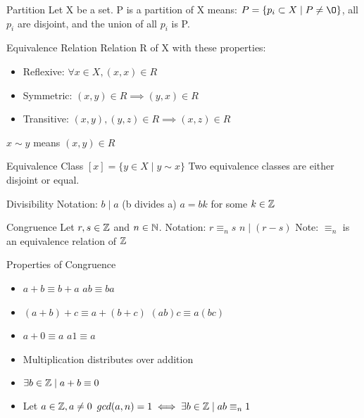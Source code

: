 \begin{flashcard}[Definition]{Partition}
  Let X be a set. P is a partition of X means:
  \vfill
  $P = \{ p_i \subset X \mid P \neq \O \}$, all $p_i$ are disjoint, and the union of all $p_i$ is P.
\end{flashcard}

\begin{flashcard}[Definition]{Equivalence Relation}
  Relation R of X with these properties:
  \begin{itemize}
    \item Reflexive:  $\forall x \in X, (x,x) \in R$
    \item Symmetric:  $(x,y) \in R \implies (y,x) \in R$
    \item Transitive: $(x,y), (y,z) \in R \implies (x,z) \in R$
  \end{itemize}
  $x \sim y$ means $(x,y) \in R$
\end{flashcard}

\begin{flashcard}[Definition]{Equivalence Class}
  $[x] = \{y \in X \mid y \sim x\}$
  \vfill
  Two equivalence classes are either disjoint or equal.
\end{flashcard}

\begin{flashcard}[Definition]{Divisibility}
  Notation: $b \mid a$ (b divides a)
  \vfill
  $a = bk$ for some $k \in \mathbb{Z}$
\end{flashcard}

\begin{flashcard}[Definition]{Congruence}
  Let $r,s \in \mathbb{Z}$ and $n \in \mathbb{N}$.
  \vfill
  Notation: $r \equiv_n s$
  \vfill
  $n \mid (r - s)$
  \vfill
  Note: $\equiv_n$ is an equivalence relation of $\mathbb{Z}$
\end{flashcard}

\begin{flashcard}[Definition]{Properties of Congruence}
  \begin{itemize}
    \item $a + b \equiv b + a$ \quad $ab \equiv ba$
    \item $(a + b) + c \equiv a + (b + c)$ \quad  $(ab)c \equiv a(bc)$
    \item $a + 0 \equiv a$ \quad $a1 \equiv a$
    \item Multiplication distributes over addition
    \item $\exists b \in \mathbb{Z} \mid a + b \equiv 0 $
    \item Let $a \in \mathbb{Z}, a \neq 0$
      \newline
      $gcd(a,n) = 1 \iff \exists b \in \mathbb{Z} \mid ab \equiv_n 1$
  \end{itemize}
\end{flashcard}

